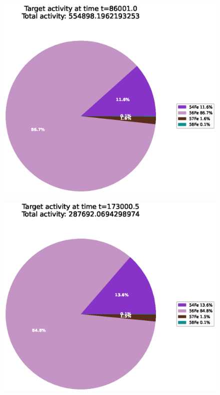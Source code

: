 \begin{figure}[!htb]
\centering
\includegraphics[width=0.8\linewidth]{chapters/results_activity_code/fe-activity-v2/target-activity/0166_86001.eps}
\caption{}
\label{fig:activity-v2-target-activity-86001s}
\end{figure}


\begin{figure}[!htb]
\centering
\includegraphics[width=0.8\linewidth]{chapters/results_activity_code/fe-activity-v2/target-activity/0233_173000.eps}
\caption{}
\label{fig:activity-v2-target-activity-173000s}
\end{figure}

